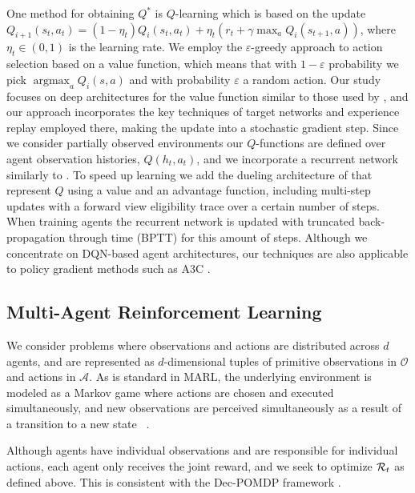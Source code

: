 \documentclass{article}
\def\argmax{\mathop{\arg\max}}
\def\R{{\cal R}}
\def\R{{\cal R}}
\begin{document}
One method for obtaining $Q^*$ is $Q$-learning which is based on the update $Q_{i+1}(s_t,a_t)=(1-\eta_t) Q_i(s_t,a_t)+\eta_t(r_t+\gamma \max_a Q_i(s_{t+1},a))$, where $\eta_t\in (0,1)$ is the learning rate. We employ the $\varepsilon$-greedy approach to action selection based on a value function, which means that with $1-\varepsilon$ probability we pick $\argmax_a Q_i(s,a)$ and with probability $\varepsilon$ a random action. Our study focuses on deep architectures for the value function similar to those used by \citet{dqn15}, and our approach incorporates the key techniques of target networks and experience replay employed there, making the update into a stochastic gradient step. Since we consider partially observed environments our $Q$-functions are defined over agent observation histories, $Q(h_t,a_t)$,  and we incorporate a recurrent network similarly to \citet{HausknechtStoneRecurrent}. To speed up learning we add the dueling architecture of \citet{WangDuelling} that represent $Q$ using a value and an advantage function, including multi-step updates with a forward view eligibility trace \citep[e.g.][]{HarbPrecupRecurrance} over a certain number of steps. When training agents the recurrent network is updated with truncated back-propagation through time (BPTT) for this amount of steps. Although we concentrate on DQN-based agent architectures, our techniques are also applicable to policy gradient methods such as A3C \citep{MnihAsynchronous}.

\subsection{Multi-Agent Reinforcement Learning}

We consider problems where observations and actions are distributed across $d$ agents, and are represented as $d$-dimensional tuples of primitive observations in $\mathcal{O}$ and actions in $\mathcal{A}$. As is standard in MARL, the underlying environment is modeled as a Markov game where actions are chosen and executed simultaneously, and new observations are perceived simultaneously as a result of a transition to a new state ~\citep{Littman94,Littman01,HuW03,Busoniu08MARL}.

Although agents have individual observations and are responsible for individual actions, each agent only receives the joint reward, and we seek to optimize $\R_t$ as defined above. This is consistent with the Dec-POMDP framework \citep{OliehoekSV08, OliehoekAmato16book}. 
\end{document}
